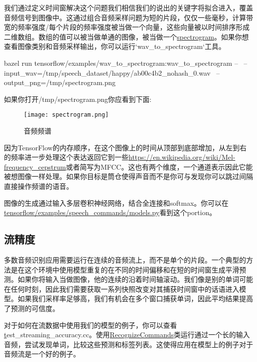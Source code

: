 {我们通过定义时间窗解决这个问题我们相信我们的说出的关键字将拟合进入，覆盖音频信号到图像中。这通过组合音频采样问题为短的片段，仅仅一些毫秒，计算带宽的频率强度/每个片段的频率强度被当做一个向量，这些向量被以时间排序形成二维数组。数组的值可以被当做单通的图像，被当做一个\href{https://en.wikipedia.org/wiki/Spectrogram}{spectrogram}。如果你想查看图像类别和音频采样输出，你可以运行`wav\_to\_spectrogram`工具。
\begin{bashcode}
bazel run tensorflow/examples/wav_to_spectrogram:wav_to_spectrogram -- \
--input_wav=/tmp/speech_dataset/happy/ab00c4b2_nohash_0.wav \
--output_png=/tmp/spectrogram.png 
\end{bashcode}
如果你打开/tmp/spectrogram.png你应看到下面:
\begin{figure}[H]
\centering
\texttt{[image: spectrogram.png]}
\caption{音频频谱}
\end{figure}
因为TensorFlow的内存顺序，在这个图像上的时间从顶部到底部增加，从左到右的频率进一步处理这个表达返回它到一些\href{Mel-Frequency Cepstral Coefficients}{https://en.wikipedia.org/wiki/Mel-frequency_cepstrum}或者简写为MFCC。这也有两个维度，一个通道表示因此它能被想图像一样处理。如果你目标是筒仓使得声音而不是你可与发现你可以跳过间隔直接操作频谱的语音。

图像的生成通过输入多层卷积神经网络，结合全连接和softmax。你可以在\href{https://github.com/tensorflow/tensorflow/tree/master/tensorflow/examples/speech_commands/models.py}{tensorflow/examples/speech_commands/models.py}看到这个portion。
\subsection{流精度}
多数音频识别应用需要运行在连续的音频流上，而不是单个的片段。一个典型的方法是在这个环境中使用模型重复的在不同的时间偏移和在短的时间窗生成平滑预测。如果你将输入当做图像，他的连续的沿着时间轴滚动。我们像是别的单词可能在任何时刻，因此我们需要获取一系列快照改变对其捕获时间窗中的话语进入模型。如果我们采样率足够高，我们有机会在多个窗口捕获单词，因此平均结果提高了预测的可信度。

对于如何在流数据中使用我们的模型的例子，你可以查看\href{https://github.com/tensorflow/tensorflow/tree/master/tensorflow/examples/speech_commands/}test_streaming\_accuracy.cc{}。使用\href{https://github.com/tensorflow/tensorflow/tree/master/tensorflow/examples/speech_commands/recognize_commands.h}{RecognizeCommands}类运行通过一个长的输入音频，尝试发现单词，比较这些预测和标签列表。这使得应用在模型上的例子对于音频流是一个好的例子。

}

